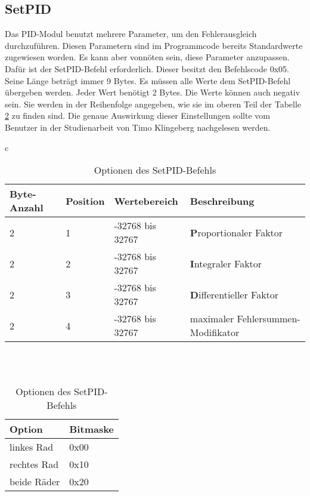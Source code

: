 \subsection{SetPID}
Das PID-Modul benutzt mehrere Parameter, um den Fehlerausgleich durchzuführen. Diesen
Parametern sind im Programmcode bereits Standardwerte zugewiesen worden. Es kann aber
vonnöten sein, diese Parameter anzupassen. Dafür ist der SetPID-Befehl erforderlich.
Dieser besitzt den Befehlscode 0x05. Seine Länge beträgt immer 9 Bytes. Es müssen
alle Werte dem SetPID-Befehl übergeben werden. Jeder Wert benötigt 2 Bytes.
Die Werte können auch negativ sein. Sie werden in der Reihenfolge angegeben,
wie sie im oberen Teil der Tabelle \ref{protocol_setpid} zu finden sind.
Die genaue Auswirkung dieser Einstellungen sollte vom Benutzer in der Studienarbeit von
Timo Klingeberg \cite{STUD_TIMO} nachgelesen werden.
\begin{table}[htb]
\begin{center}
	\begin{tabular}{c}
	\begin{tabularx}{\linewidth}{|l|l|l|X|}
		\hline
		\textbf{Byte-Anzahl} & \textbf{Position} & \textbf{Wertebereich} & \textbf{Beschreibung} \\
		\hline
		\hline
		2					 & 1 & -32768 bis 32767 & \textbf{P}roportionaler Faktor\\
		\hline
		2					 & 2 & -32768 bis 32767 & \textbf{I}ntegraler Faktor\\
		\hline
		2					 & 3 & -32768 bis 32767 & \textbf{D}ifferentieller Faktor\\
		\hline
		2					 & 4 & -32768 bis 32767 & maximaler Fehlersummen-Modifikator\\
		\hline
	\end{tabularx}\\
	\\
	\begin{tabularx}{\linewidth}{|l|X|}
		\hline
		\textbf{Option} & \textbf{Bitmaske} \\
		\hline
		\hline
		linkes Rad	& 0x00 \\
		\hline
		rechtes Rad	& 0x10 \\
		\hline
		beide Räder & 0x20 \\
		\hline
	\end{tabularx}
	\end{tabular}
	\caption{\label{protocol_setpid} Optionen des SetPID-Befehls}
\end{center}
\end{table}

